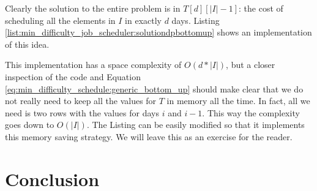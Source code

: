 Clearly the solution to the entire problem is in $T[d][|I|-1]$: the cost of scheduling all the
elements in $I$ in exactly $d$ days. Listing
\ref{list:min_difficulty_job_scheduler:solutiondpbottomup} shows an implementation of this idea.



This implementation has a space complexity of $O(d*|I|)$, but a closer inspection of the code and
Equation \ref{eq:min_difficulty_schedule:generic_bottom_up} should make clear that we do not really
need to keep all the values for $T$ in memory all the time. In fact,  all we need is two rows with the
values for days $i$ and $i-1$. This way the complexity goes down to $O(|I|)$. The Listing can be easily
modified so that it implements this memory saving strategy. We will leave this as an exercise for the
reader.


\section{Conclusion}